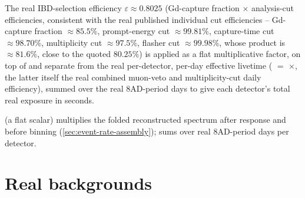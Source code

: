 \begin{theorybox}
The real IBD-selection efficiency $\varepsilon\approx0.8025$
(Gd-capture fraction $\times$ analysis-cut efficiencies, consistent with
the real published individual cut efficiencies -- Gd-capture fraction
$\approx85.5\%$, prompt-energy cut $\approx99.81\%$, capture-time cut
$\approx98.70\%$, multiplicity cut $\approx97.5\%$, flasher cut
$\approx99.98\%$, whose product is $\approx81.6\%$, close to the quoted
$80.25\%$) is applied as a flat multiplicative factor, on top of and
separate from the real per-detector, per-day effective livetime
( $=$ $\times$, the latter
itself the real combined muon-veto and multiplicity-cut daily efficiency),
summed over the real 8AD-period days to give each detector's total real
exposure in seconds.
\end{theorybox}

\begin{implbox}
 (a flat scalar) multiplies the folded
reconstructed spectrum after response and before binning
(\cref{sec:event-rate-assembly});  sums
 over real 8AD-period days per detector.
\end{implbox}

\section{Real backgrounds}
\label{sec:backgrounds}

